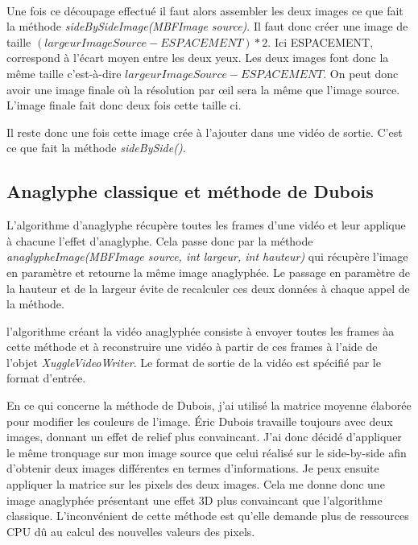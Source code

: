 \documentclass[10pt,a4paper]{article}
\begin{document}

~~\\

Une fois ce découpage effectué il faut alors assembler les deux images ce que fait la méthode \textit{sideBySideImage(MBFImage source)}.
Il faut donc créer une image de taille $(largeurImageSource - ESPACEMENT) * 2$. Ici ESPACEMENT, correspond à l'écart moyen entre les deux yeux.
Les deux images font donc la même taille c'est-à-dire $largeurImageSource - ESPACEMENT$. On peut donc avoir une image finale où la résolution par œil sera la même que l'image source. L'image
finale fait donc deux fois cette taille ci.

Il reste donc une fois cette image crée à l'ajouter dans une vidéo de sortie. C'est ce que fait la méthode \textit{sideBySide()}.



\subsection{Anaglyphe classique et méthode de Dubois}

L'algorithme d'anaglyphe récupère toutes les frames d'une vidéo et leur applique à chacune l'effet d'anaglyphe. Cela passe donc par la méthode \textit{anaglypheImage(MBFImage source, int largeur, int hauteur)}
qui récupère l'image en paramètre et retourne la même image anaglyphée. Le passage en paramètre de la hauteur et de la largeur évite de recalculer ces deux données à chaque appel de la méthode.


l'algorithme créant la vidéo anaglyphée consiste à envoyer toutes les frames àa cette méthode et à reconstruire une vidéo à partir de ces frames à l'aide de l'objet
\textit{XuggleVideoWriter}. Le format de sortie de la vidéo est spécifié par le format d'entrée.

En ce qui concerne la méthode de Dubois, j'ai utilisé la matrice moyenne élaborée pour modifier les couleurs de l'image. Éric Dubois travaille toujours avec deux images, donnant un effet de relief plus
convaincant. J'ai donc décidé d'appliquer le même tronquage sur mon image source que celui réalisé sur le side-by-side afin d'obtenir deux images différentes en termes d'informations. Je peux ensuite
appliquer la matrice sur les pixels des deux images. Cela me donne donc une image anaglyphée présentant une effet 3D plus convaincant que l'algorithme classique. L'inconvénient de cette méthode est
qu'elle demande plus de ressources CPU dû au calcul des nouvelles valeurs des pixels.
\end{document}
